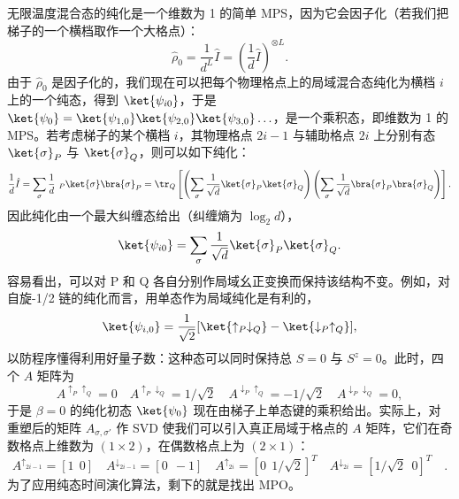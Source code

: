 无限温度混合态的纯化是一个维数为 1 的简单 MPS，因为它会因子化（若我们把梯子的一个横档取作一个大格点）：
\begin{equation}
\hat{\rho}_0 = \frac{1}{d^L} \hat{I} = \left(\frac{1}{d} \hat{I}\right)^{\otimes L} .
\end{equation}
由于 $\hat{\rho}_0$ 是因子化的，我们现在可以把每个物理格点上的局域混合态纯化为横档 $i$ 上的一个纯态，得到 $\ket{\psi_{i0}}$，于是 
$\ket{\psi_0} = \ket{\psi_{1,0}}\ket{\psi_{2,0}}\ket{\psi_{3,0}} \ldots$，是一个乘积态，即维数为 1 的 MPS。若考虑梯子的某个横档 $i$，其物理格点 $2i-1$ 与辅助格点 $2i$ 上分别有态 $\ket{\sigma}_P$ 与 $\ket{\sigma}_Q$，则可以如下纯化：
\begin{equation}
\frac{1}{d} \hat{I} = \sum_{\sigma} \frac{1}{d} \phantom\langle_P\ket{\sigma}\bra{\sigma}_P = \tr_Q \left[ \left( \sum_{\sigma} \frac{1}{\sqrt{d}} \ket{\sigma}_P \ket{\sigma}_Q \right) \left( \sum_{\sigma} \frac{1}{\sqrt{d}} \bra{\sigma}_P \bra{\sigma}_Q  \right) \right] .
\end{equation}
因此纯化由一个最大纠缠态给出（纠缠熵为 $\log_2 d$），
\begin{equation}
\ket{\psi_{i0}} = \sum_{\sigma} \frac{1}{\sqrt{d}} \ket{\sigma}_P \ket{\sigma}_Q .
\end{equation}
容易看出，可以对 P 和 Q 各自分别作局域幺正变换而保持该结构不变。例如，对自旋-1/2 链的纯化而言，用单态作为局域纯化是有利的，
\begin{equation}
\ket{\psi_{i,0}} = \frac{1}{\sqrt{2}} [ \ket{\uparrow_P\downarrow_Q} - \ket{\downarrow_P\uparrow_Q} ],
\end{equation}
以防程序懂得利用好量子数：这种态可以同时保持总 $S=0$ 与 $S^z=0$。此时，四个 $A$ 矩阵为
\begin{equation}
A^{\uparrow_P\uparrow_Q} =0 \quad 
A^{\uparrow_P\downarrow_Q} =1/\sqrt{2} \quad 
A^{\downarrow_P\uparrow_Q} =-1/\sqrt{2} \quad 
A^{\downarrow_P\downarrow_Q} =0  ,
\end{equation}
于是 $\beta=0$ 的纯化初态 $\ket{\psi_0}$ 现在由梯子上单态键的乘积给出。实际上，对重塑后的矩阵 $A_{\sigma,\sigma'}$ 作 SVD 使我们可以引入真正局域于格点的 $A$ 矩阵，它们在奇数格点上维数为 $(1\times 2)$，在偶数格点上为 $(2\times 1)$：
\begin{equation}
A^{\uparrow_{2i-1}} = [ 1\ \ 0] \quad
A^{\downarrow_{2i-1}} = [ 0\ \ -1] \quad
A^{\uparrow_{2i}} = [ 0\ \ 1/\sqrt{2}]^T \quad
A^{\downarrow_{2i}} = [ 1/\sqrt{2} \ \ 0]^T \quad .
\end{equation}
为了应用纯态时间演化算法，剩下的就是找出 MPO。
 
